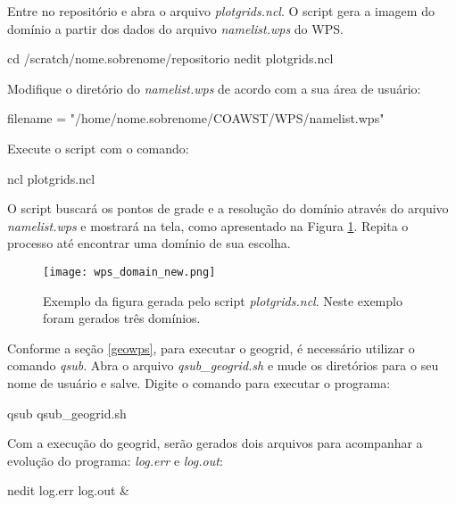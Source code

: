 \noindent Entre no repositório e abra o arquivo \textit{plotgrids.ncl}. O script gera a imagem do domínio a partir dos dados do arquivo \textit{namelist.wps} do WPS.
\bigskip

\begin{bashcode}
cd /scratch/nome.sobrenome/repositorio
nedit plotgrids.ncl
\end{bashcode}
\bigskip

\noindent Modifique o diretório do \textit{namelist.wps} de acordo com a sua área de usuário:
\bigskip

\begin{bashcode}
filename = "/home/nome.sobrenome/COAWST/WPS/namelist.wps"
\end{bashcode}
\bigskip

\noindent Execute o script com o comando:
\bigskip

\begin{bashcode}
ncl plotgrids.ncl
\end{bashcode}
\bigskip

\noindent O script buscará os pontos de grade e a resolução do domínio através do arquivo \textit{namelist.wps} e mostrará na tela, como apresentado na Figura \textcolor{bleu_cite}{\ref{nclgrids}}. Repita o processo até encontrar uma domínio de sua escolha.
\bigskip

\begin{figure}[H]
    \centering
    \texttt{[image: wps\_domain\_new.png]}
    \caption{Exemplo da figura gerada pelo script \textit{plotgrids.ncl}. Neste exemplo foram gerados três domínios.}
    \label{nclgrids}
\end{figure}
\bigskip


\noindent Conforme a seção \textcolor{bleu_cite}{\ref{geowps}}, para executar o geogrid, é necessário utilizar o comando \textit{qsub}. Abra o arquivo \textit{qsub\_geogrid.sh} e mude os diretórios para o seu nome de usuário e salve. Digite o comando para executar o programa:
\bigskip

\begin{bashcode}
qsub qsub_geogrid.sh
\end{bashcode}
\bigskip

\noindent Com a execução do geogrid, serão gerados dois arquivos para acompanhar a evolução do programa: \textit{log.err} e \textit{log.out}:
\bigskip

\begin{bashcode}
nedit log.err log.out &
\end{bashcode}
\bigskip

